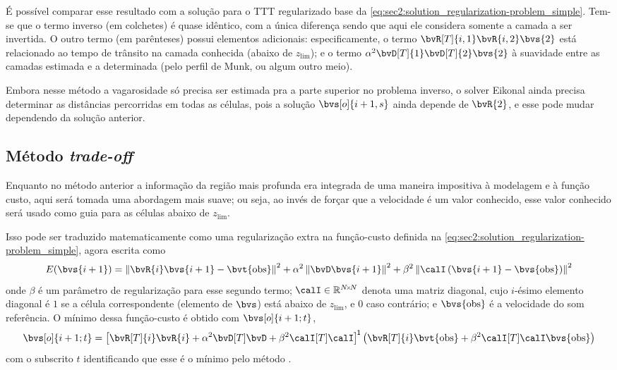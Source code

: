 É possível comparar esse resultado com a solução para o TTT regularizado base da \cref{eq:sec2:solution_regularization-problem_simple}. Tem-se que o termo inverso (em colchetes) é quase idêntico, com a única diferença sendo que aqui ele considera somente a camada a ser invertida. O outro termo (em parênteses) possui elementos adicionais: especificamente, o termo $\bvR[T]{i,1} \bvR{i,2} \bvs{2}$ está relacionado ao tempo de trânsito na camada conhecida (abaixo de $z_{\lim}$); e o termo $\alpha^2 \bvD[T]{1} \bvD[T]{2} \bvs{2}$ à suavidade entre as camadas estimada e a determinada  (pelo perfil de Munk, ou algum outro meio).

Embora nesse método a vagarosidade só precisa ser estimada pra a parte superior no problema inverso, o solver Eikonal ainda precisa determinar as distâncias percorridas em todas as células, pois a solução $\bvs[o]{i+1,s}$ ainda depende de $\bvR{2}$, e esse pode mudar dependendo da solução anterior.

\subsection{Método \textsl{trade-off}}
\label{subsec:sec4:metodo_trade-off}

Enquanto no método anterior a informação  da região mais profunda era integrada de uma maneira impositiva à modelagem e à função custo, aqui será tomada uma abordagem mais suave; ou seja, ao invés de forçar que a velocidade é um valor conhecido, esse valor conhecido será usado como guia para as células abaixo de $z_{\lim}$.

Isso pode ser traduzido matematicamente como uma regularização extra na função-custo definida na \cref{eq:sec2:solution_regularization-problem_simple}, agora escrita como
\begin{equation}
	E(\bvs{i+1}) = \norm{ \bvR{i} \bvs{i+1} - \bvt{\obs} }^2 + \alpha^2 \norm{ \bvD \bvs{i+1} }^2 + \beta^2 \norm{\calI \pts{\bvs{i+1} - \bvs{\obs}}}^2
\end{equation}
onde $\beta$ é um parâmetro de regularização para esse segundo termo; $\calI \in \re^{\sz{N}{N}}$ denota uma matriz diagonal, cujo $i$-ésimo elemento diagonal é $1$ se a célula correspondente (elemento de $\bvs$) está abaixo de $z_{\lim}$, e $0$ caso contrário; e $\bvs{\obs}$ é a velocidade do som referência. O mínimo dessa função-custo é obtido com $\bvs[o]{i+1;t}$,
\begin{equation}
	\bvs[o]{i+1;t} = \inv*{\bvR[T]{i} \bvR{i} + \alpha^2 \bvD[T] \bvD + \beta^2 \calI[T] \calI} \pts{\bvR[T]{i} \bvt{\obs} + \beta^2 \calI[T] \calI \bvs{\obs}}
\end{equation}
com o subscrito $t$ identificando que esse é o mínimo pelo método .

